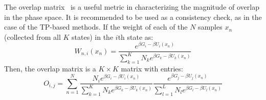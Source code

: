 The overlap matrix~\cite{KlimovichJCAMD2015} is a useful metric in characterizing the magnitude of overlap in the phase space. It is recommended to be used as a consistency check, as in the case of the TP-based methods. If the weight of each of the $N$ samples $x_{n}$ (collected from all $K$ states) in the $i$th state as:
\begin{equation}
W_{n,i}(x_{n}) = \frac{e^{\beta G_{i} - \beta U_{i}(x_{n})}}{\sum_{k=1}^{K} N_{k}e^{\beta G_{k}-\beta U_{k}(x_{n})}}
\label{Eq:FEM:TP:weights}
\end{equation}
Then, the overlap matrix is a $K \times K$ matrix with entries:
\begin{equation}
O_{i,j} = \sum_{n=1}^{N}\frac{N_{i} e^{\beta G_{i} - \beta U_{i}(x_{n})}}{\sum_{k=1}^{K} N_{k}e^{\beta G_{k}-\beta U_{k}(x_{n})}}\frac{e^{\beta G_{j} - \beta U_{j}(x_{n})}}{\sum_{l=1}^{L} N_{l}e^{\beta G_{l}-\beta U_{l}(x_{n})}}
\label{Eq:FEM:TP:om}
\end{equation}
